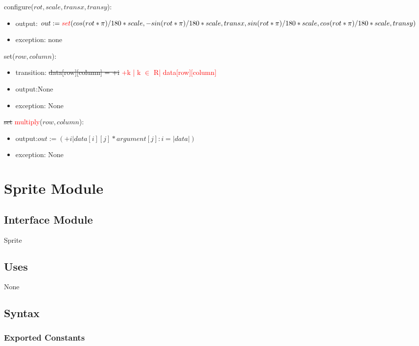\documentclass[12pt]{article}
\begin{document}
\noindent configure($rot, scale, transx, transy$):
\begin{itemize}
\item output: $out := \textcolor{red}{set}(cos(rot * \pi)/180 *scale ,-sin(rot * \pi)/180 *scale,transx ,sin(rot * \pi)/180 *scale,cos(rot * \pi)/180 *scale,transy )$
\item exception: none
\end{itemize}

\noindent set($row, column$):
\begin{itemize}
\item transition: \sout{data[row][column] = +i} \textcolor{red}{+k | k $\in$ R| data[row][column]}
\item output:None
\item exception: None
\end{itemize}

\noindent \sout{set} \textcolor{red}{multiply}($row, column$):
\begin{itemize}
\item output:$out := (+i| data[i][j] * argument[j]: i = |data|)$
\item exception: None
\end{itemize}

\newpage









\section* {Sprite Module}

\subsection*{Interface Module}

Sprite

\subsection* {Uses}

None

\subsection* {Syntax}

\subsubsection* {Exported Constants}
\end{document}
